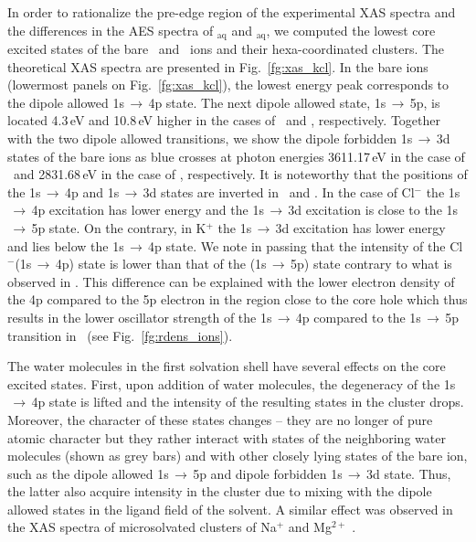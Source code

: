 In order to rationalize the pre-edge region of the experimental XAS spectra and the differences in the AES spectra of \ki$_{\text{aq}}$ and \cli$_{\text{aq}}$, we computed the lowest core excited states of the bare \ki~and \cli~ions and their hexa-coordinated clusters. The theoretical XAS spectra are presented in Fig.\ \ref{fg:xas_kcl}. In the bare ions (lowermost panels on Fig.\ \ref{fg:xas_kcl}), the lowest energy peak corresponds to the dipole allowed 1s$\,\rightarrow\,$4p state. The next dipole allowed state, 1s$\,\rightarrow\,$5p, is located 4.3\,eV and 10.8\,eV higher in the cases of \ki~and \cli, respectively. Together with the two dipole allowed transitions, we show the dipole forbidden 1s$\,\rightarrow\,$3d states of the bare ions as blue crosses at photon energies 3611.17\,eV in the case of \ki~and 2831.68\,eV in the case of \cli, respectively. It is noteworthy that the positions of the 1s$\,\rightarrow\,$4p and 1s$\,\rightarrow\,$3d states are inverted in \ki~and \cli. In the case of Cl$^{-}$ the 1s$\,\rightarrow\,$4p excitation has lower energy and the 1s$\,\rightarrow\,$3d excitation is close to the 1s$\,\rightarrow\,$5p state. On the contrary, in K$^{+}$ the 1s$\,\rightarrow\,$3d excitation has lower energy and lies below the 1s$\,\rightarrow\,$4p state. We note in passing that the intensity of the Cl$^{-}$(1s$\,\rightarrow\,$4p) state is lower than that of the \cli(1s$\,\rightarrow\,$5p) state contrary to what is observed in \ki. This difference can be explained with the lower electron density of the 4p compared to the 5p electron in the region close to the core hole which thus results in the lower oscillator strength of the 1s$\,\rightarrow\,$4p compared to the 1s$\,\rightarrow\,$5p transition in \cli~(see Fig.\ \ref{fg:rdens_ions}).


The water molecules in the first solvation shell have several effects on the core excited states. First, upon addition of water molecules, the degeneracy of the 1s$\,\rightarrow\,$4p state is lifted and the intensity of the resulting states in the cluster drops. Moreover, the character of these states changes -- they are no longer of pure atomic character but they rather interact with states of the neighboring water molecules (shown as grey bars) and with other closely lying states of the bare ion, such as the dipole allowed 1s$\,\rightarrow\,$5p and dipole forbidden 1s$\,\rightarrow\,$3d state. Thus, the latter also acquire intensity in the cluster due to mixing with the dipole allowed states in the ligand field of the solvent. A similar effect was observed in the XAS spectra of microsolvated clusters of Na$^{+}$ and Mg$^{2+}$ \citep{miteva16:16671}.


